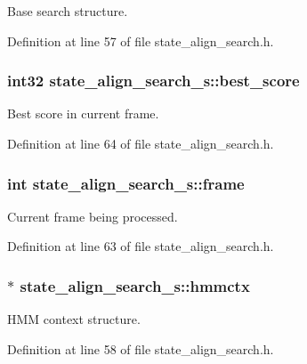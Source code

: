 Base search structure. 



Definition at line 57 of file state\-\_\-align\-\_\-search.\-h.

\subsubsection[{best\-\_\-score}]{\setlength{\rightskip}{0pt plus 5cm}int32 state\-\_\-align\-\_\-search\-\_\-s\-::best\-\_\-score}\label{structstate__align__search__s_a1810f343c6ae382f5ed0a5eb02d33037}


Best score in current frame. 



Definition at line 64 of file state\-\_\-align\-\_\-search.\-h.

\subsubsection[{frame}]{\setlength{\rightskip}{0pt plus 5cm}int state\-\_\-align\-\_\-search\-\_\-s\-::frame}\label{structstate__align__search__s_aa520abfdb4d0bca2b769f281839637a9}


Current frame being processed. 



Definition at line 63 of file state\-\_\-align\-\_\-search.\-h.

\subsubsection[{hmmctx}]{$\ast$ state\-\_\-align\-\_\-search\-\_\-s\-::hmmctx}\label{structstate__align__search__s_a683e76dbcc87cde89ca5d45b4b91c1e9}


H\-M\-M context structure. 



Definition at line 58 of file state\-\_\-align\-\_\-search.\-h.

